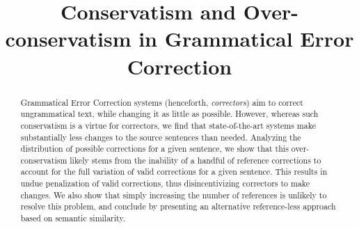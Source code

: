 \documentclass[letter,11pt]{article}
\begin{document}
\title{Conservatism and Over-conservatism in Grammatical Error Correction}
\maketitle

\begin{abstract}
  Grammatical Error Correction systems (henceforth, {\it correctors}) aim to correct ungrammatical text,
  while changing it as little as possible. However, whereas such conservatism is a virtue for correctors,
  we find that state-of-the-art systems make substantially less changes to the source sentences than needed.
  Analyzing the distribution of possible corrections for a given sentence,   
  we show that this over-conservatism likely stems from
  the inability of a handful of reference corrections to account for the full variation of valid
  corrections for a given sentence. This results in undue penalization of valid corrections,
  thus disincentivizing correctors to make changes.
  We also show that simply increasing the number of references is unlikely to resolve this problem,
  and conclude by presenting an alternative reference-less approach based on semantic similarity.
\end{abstract}
\end{document}
